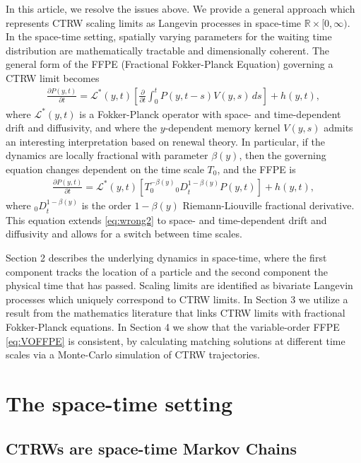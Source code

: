 \documentclass[a4paper,12pt]{elsarticle}
\numberwithin{equation}{section}
\theoremstyle{plain}
\theoremstyle{definition}
\theoremstyle{remark}
\numberwithin{equation}{section}
\newcommand{\spc}{\mathbb R}
\newcommand{\spctim}{\spc \times [0,\infty)}
\newcommand{\1}{\mathbf 1}
\newcommand{\del}{\partial}
\begin{document}
In this article, we resolve the issues above.  We provide a general approach
which represents CTRW scaling limits as Langevin processes in space-time
$\spctim$.  In the space-time setting, spatially varying parameters for the
waiting time distribution are mathematically tractable and dimensionally
coherent.  The general form of the FFPE (Fractional Fokker-Planck Equation)
governing a CTRW limit becomes
\begin{align}
\frac{\del P(y,t)}{\del t} = \mathcal L^*(y,t) \left[ \frac{\partial}{\partial t}
\int_0^t P(y,t-s) V(y,s)\,ds \right] + h(y,t),
\end{align}
where $\mathcal L^*(y,t)$ is a Fokker-Planck operator with space- and
time-dependent drift and diffusivity, and
where the $y$-dependent memory kernel $V(y,s)$ admits an interesting 
interpretation
based on renewal theory.  In particular, if the dynamics are locally fractional
with parameter $\beta(y)$, then the governing equation changes dependent on the 
time scale $T_0$, and the FFPE is
\begin{align} \label{eq:VOFFPE}
\frac{\del P(y,t)}{\del t}
= \mathcal L^*(y,t) \left[ T_0^{-\beta(y)} {_0 D}_t^{1-\beta(y)} P(y,t) \right] + h(y,t),
\end{align}
where ${_0 D}_t^{1-\beta(y)}$ is the order $1-\beta(y)$ Riemann-Liouville
fractional derivative.  This equation extends \eqref{eq:wrong2} to
space- and time-dependent drift and diffusivity and allows for a switch
between time scales.


Section 2 describes the underlying dynamics in space-time, where the first
component tracks the location of a particle and the second component the
physical time that has passed.  Scaling limits are identified as bivariate
Langevin processes which uniquely correspond to CTRW limits.
In Section 3 we utilize a result from the mathematics literature that links CTRW 
limits with fractional Fokker-Planck equations.
In Section 4 we show that the variable-order FFPE \eqref{eq:VOFFPE} is consistent, by  calculating matching solutions at different time scales via a Monte-Carlo simulation of CTRW trajectories.


\section{The space-time setting}

\subsection{CTRWs are space-time Markov Chains}
\end{document}
